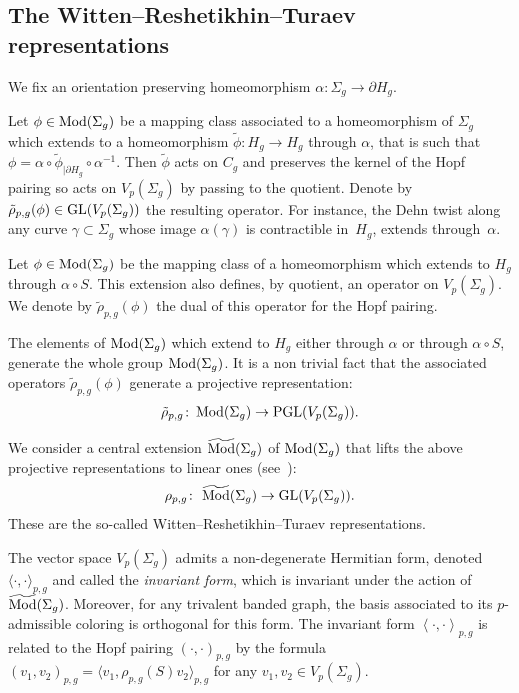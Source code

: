 \documentclass[11pt]{article}
\numberwithin{equation}{section}
\begin{document}
\subsection{The Witten--Reshetikhin--Turaev representations}\label{section2.2}

We fix an orientation preserving homeomorphism $\alpha\colon \Sigma_g \rightarrow \partial H_g$.

Let $\phi \in \operatorname{Mod}(\Sigma_g)$ be a mapping class associated to a homeomorphism of $\Sigma_g$ which extends to a homeomorphism $\widetilde{\phi}\colon H_g\rightarrow H_g$ through $\alpha$, that is such that $\phi=\alpha\circ \widetilde{\phi}_{| \partial H_g}\circ \alpha^{-1}$. Then $\widetilde{\phi}$ acts on $C_g$ and preserves the kernel of the Hopf pairing so acts on $V_{p}(\Sigma_g)$ by passing to the quotient. Denote by $\tilde{\rho}_{p,g}(\phi) \in \operatorname{GL}(V_{p}(\Sigma_g))$ the resulting operator. For instance, the Dehn twist along any curve $\gamma\subset \Sigma_g$ whose image $\alpha(\gamma)$ is contractible in~$H_g$, extends through~$\alpha$.

Let $\phi\in \operatorname{Mod}(\Sigma_g)$ be the mapping class of a homeomorphism which extends to $H_g$ through $\alpha\circ S$. This extension also defines, by quotient, an operator on $V_{p}(\Sigma_g)$. We denote by $\tilde{\rho}_{p,g}(\phi)$ the dual of this operator for the Hopf pairing.

The elements of $\operatorname{Mod}(\Sigma_g)$ which extend to $H_g$ either through $\alpha$ or through $\alpha\circ S$, generate the whole group $\operatorname{Mod}(\Sigma_g)$. It is a non trivial fact that the associated operators $\tilde{\rho}_{p,g}(\phi)$ generate a projective representation:
\begin{gather*} \tilde{\rho}_{p,g} \colon \operatorname{Mod}(\Sigma_g) \rightarrow \operatorname{PGL}(V_{p}(\Sigma_g)).\end{gather*}

We consider a central extension $\widetilde{\operatorname{Mod}}(\Sigma_g)$ of $\operatorname{Mod}(\Sigma_g)$ that lifts the above projective representations to linear ones (see~\cite{GM13, MR}):
\begin{gather*} \rho_{p,g} \colon \ \widetilde{\operatorname{Mod}}(\Sigma_g) \rightarrow \operatorname{GL}(V_{p}(\Sigma_g)).\end{gather*}
These are the so-called Witten--Reshetikhin--Turaev representations.

The vector space $V_p(\Sigma_g)$ admits a non-degenerate Hermitian form, denoted $\langle \cdot, \cdot\rangle_{p,g}$ and called the \textit{invariant form}, which is invariant under the action of~$\widetilde{\operatorname{Mod}}(\Sigma_g)$. Moreover, for any trivalent banded graph, the basis associated to its $p$-admissible coloring is orthogonal for this form. The invariant form $\left<\cdot, \cdot\right>_{p,g}$ is related to the Hopf pairing $ (\cdot, \cdot )_{p,g}$ by the formula $ (v_1, v_2 )_{p,g}= \langle v_1, \rho_{p,g}(S)v_2\rangle _{p,g}$ for any $v_1,v_2\in V_p(\Sigma_g)$.
\end{document}
